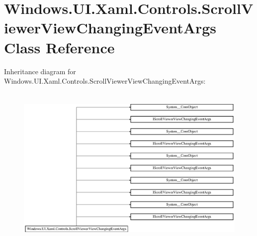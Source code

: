 \hypertarget{class_windows_1_1_u_i_1_1_xaml_1_1_controls_1_1_scroll_viewer_view_changing_event_args}{}\section{Windows.\+U\+I.\+Xaml.\+Controls.\+Scroll\+Viewer\+View\+Changing\+Event\+Args Class Reference}
\label{class_windows_1_1_u_i_1_1_xaml_1_1_controls_1_1_scroll_viewer_view_changing_event_args}
Inheritance diagram for Windows.\+U\+I.\+Xaml.\+Controls.\+Scroll\+Viewer\+View\+Changing\+Event\+Args\+:\begin{figure}[H]
\begin{center}
\leavevmode
\includegraphics[height=7.979275cm]{class_windows_1_1_u_i_1_1_xaml_1_1_controls_1_1_scroll_viewer_view_changing_event_args}
\end{center}
\end{figure}
